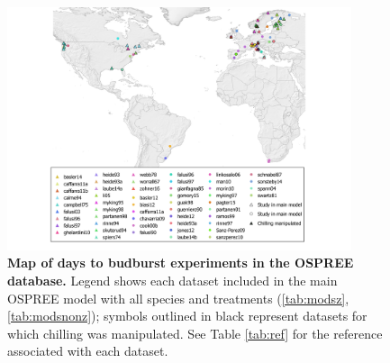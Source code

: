 \documentclass{article}
\begin{document}
\begin{figure}[h!]
\centering
\noindent \includegraphics[width=0.9\textwidth]{..//..//analyses/bb_analysis/figures/ospree_locations_definitive.png}
\caption{\textbf{Map of days to budburst experiments in the OSPREE database.} Legend shows each dataset included in the main OSPREE model with all species and treatments (\ref{tab:modsz}, \ref{tab:modsnonz}); symbols outlined in black represent datasets for which chilling was manipulated. See Table \ref{tab:ref} for the reference associated with each dataset.}
\label{fig:map}
\end{figure}
\end{document}

